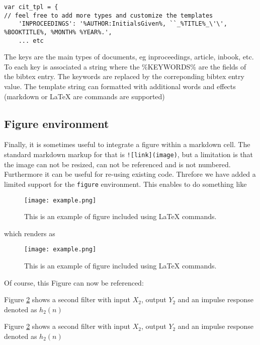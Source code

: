 \begin{verbatim}
var cit_tpl = {
// feel free to add more types and customize the templates
    'INPROCEEDINGS': '%AUTHOR:InitialsGiven%, ``_%TITLE%_\'\', %BOOKTITLE%, %MONTH% %YEAR%.',
    ... etc
\end{verbatim}

The keys are the main types of documents, eg inproceedings, article,
inbook, etc. To each key is associated a string where the \%KEYWORDS\%
are the fields of the bibtex entry. The keywords are replaced by the
correponding bibtex entry value. The template string can formatted with
additional words and effects (markdown or LaTeX are commands are
supported)

    \subsection{Figure environment}\label{figure-environment}

    Finally, it is sometimes useful to integrate a figure within a markdown
cell. The standard markdown markup for that is
\texttt{!{[}link{]}(image)}, but a limitation is that the image can not
be resized, can not be referenced and is not numbered. Furthermore it
can be useful for re-using existing code. Threfore we have added a
limited support for the \texttt{figure} environment. This enables to do
something like

\begin{listing}
\begin{figure}
\centerline{\texttt{[image: example.png]}}
\caption{\label{fig:example} This is an example of figure included using LaTeX commands.}
\end{figure}
\end{listing}

which renders as

\begin{figure}
\centerline{\texttt{[image: example.png]}}
\caption{\label{fig:example} This is an example of figure included using LaTeX commands.}
\end{figure}

Of course, this Figure can now be referenced:

\begin{listing}
Figure \ref{fig:example} shows a second filter with input $X_2$, output $Y_2$  and an impulse response denoted as $h_2(n)$
\end{listing}

Figure \ref{fig:example} shows a second filter with input \(X_2\),
output \(Y_2\) and an impulse response denoted as \(h_2(n)\)

